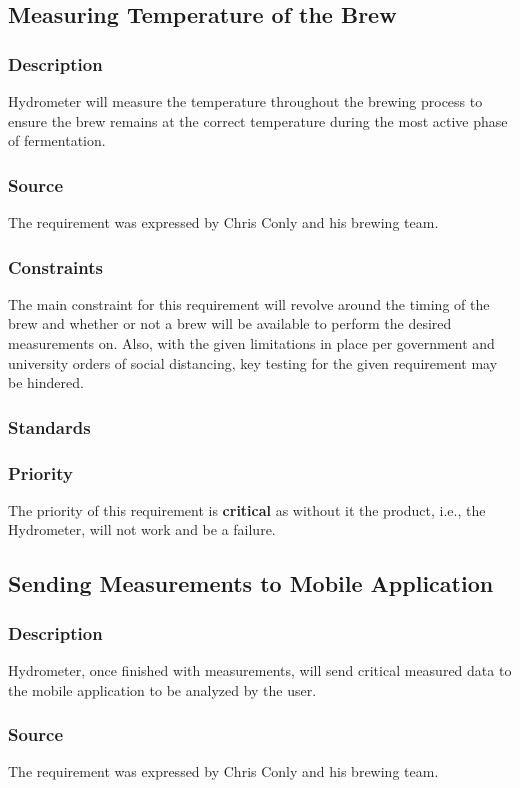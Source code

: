 \subsection{Measuring Temperature of the Brew}
\subsubsection{Description}
Hydrometer will measure the temperature throughout the brewing process to ensure the brew remains at the correct temperature during the most active phase of fermentation.
\subsubsection{Source}
The requirement was expressed by Chris Conly and his brewing team.
\subsubsection{Constraints}
The main constraint for this requirement will revolve around the timing of the brew and whether or not a brew will be available to perform the desired measurements on. Also, with the given limitations in place per government and university orders of social distancing, key testing for the given requirement may be hindered.
\subsubsection{Standards}

\subsubsection{Priority}
The priority of this requirement is \textbf{critical} as without it the product, i.e., the Hydrometer, will not work and be a failure.

\subsection{Sending Measurements to Mobile Application}
\subsubsection{Description}
Hydrometer, once finished with measurements, will send critical measured data to the mobile application to be analyzed by the user.
\subsubsection{Source}
The requirement was expressed by Chris Conly and his brewing team.
